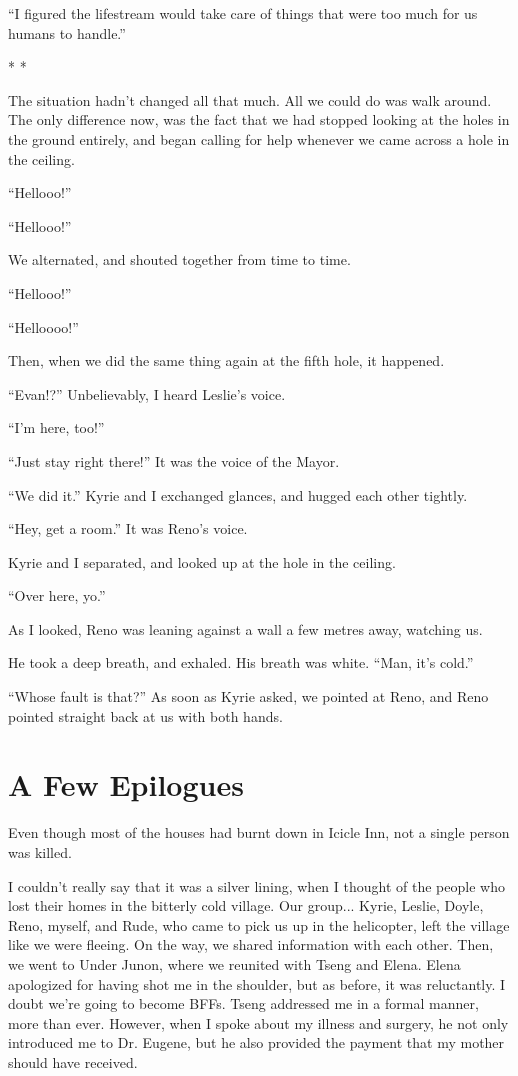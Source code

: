 \documentclass[oneside]{book}
\begin{document}
“I figured the lifestream would take care of things that were too much for us humans to handle.”

* *

The situation hadn’t changed all that much. All we could do was walk around. The only difference now, was the fact that we had stopped looking at the holes in the ground entirely, and began calling for help whenever we came across a hole in the ceiling.

“Hellooo!”

“Hellooo!”

We alternated, and shouted together from time to time.

“Hellooo!”

“Helloooo!”

Then, when we did the same thing again at the fifth hole, it happened.

“Evan!?” Unbelievably, I heard Leslie’s voice.

“I’m here, too!”

“Just stay right there!” It was the voice of the Mayor.

“We did it.” Kyrie and I exchanged glances, and hugged each other tightly.

“Hey, get a room.” It was Reno’s voice.

Kyrie and I separated, and looked up at the hole in the ceiling.

“Over here, yo.”

As I looked, Reno was leaning against a wall a few metres away, watching us.

He took a deep breath, and exhaled. His breath was white. “Man, it’s cold.”

“Whose fault is that?” As soon as Kyrie asked, we pointed at Reno, and Reno pointed straight back at us with both hands.

\chapter{A Few Epilogues}
Even though most of the houses had burnt down in Icicle Inn, not a single person was killed.

I couldn’t really say that it was a silver lining, when I thought of the people who lost their homes in the bitterly cold village. Our group... Kyrie, Leslie, Doyle, Reno, myself, and Rude, who came to pick us up in the helicopter, left the village like we were fleeing. On the way, we shared information with each other. Then, we went to Under Junon, where we reunited with Tseng and Elena. Elena apologized for having shot me in the shoulder, but as before, it was reluctantly. I doubt we’re going to become BFFs. Tseng addressed me in a formal manner, more than ever. However, when I spoke about my illness and surgery, he not only introduced me to Dr. Eugene, but he also provided the payment that my mother should have received.
\end{document}

